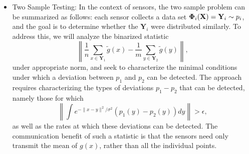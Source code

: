 \begin{itemize}
\item Two Sample Testing: 
In the context of sensors, the two sample problem can be summarized as follows: each sensor collects a data set $\mathbf{\Phi}_i(\mathbf{X})=\mathbf{Y}_i\sim p_i$, and the goal is to determine whether the $\mathbf{Y}_i$ were distributed similarly.  %
To address this, we will analyze the binarized statistic $$\left\|\frac{1}{n}\sum_{x\in \mathbf{Y}_1} \widetilde{g}(x) - \frac{1}{m}\sum_{y\in \mathbf{Y}_2} \widetilde{g}(y)\right\|,$$
under appropriate norm, and seek to characterize the minimal conditions under which a deviation between $p_1$ and $p_2$ can be detected.   The approach requires characterizing the types of deviations $p_1 - p_2$ that can be detected, namely those for which $$\left\|\int e^{-\|x-y\|^2/\sigma^2} (p_1(y) - p_2(y)) dy \right\| > \epsilon,$$ as well as the rates at which these deviations can be detected.
The communication benefit of such a statistic is that the sensors need
only transmit the mean of $g(x)$, rather than all the individual
points.  %


\end{itemize}
